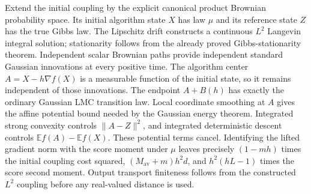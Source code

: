 \documentclass[11pt,a4paper]{report}
\begin{document}
Extend the initial coupling by the explicit canonical product Brownian probability space. Its initial algorithm state \(X\) has law \(\mu\) and its reference state \(Z\) has the true Gibbs law. The Lipschitz drift constructs a continuous \(L^{2}\) Langevin integral solution; stationarity follows from the already proved Gibbs-stationarity theorem. Independent scalar Brownian paths provide independent standard Gaussian innovations at every positive time. The algorithm center \(A=X-h\nabla f(X)\) is a measurable function of the initial state, so it remains independent of those innovations. The endpoint \(A+B(h)\) has exactly the ordinary Gaussian LMC transition law. Local coordinate smoothing at \(A\) gives the affine potential bound needed by the Gaussian energy theorem. Integrated strong convexity controls \(\|A-Z\|^{2}\), and integrated deterministic descent controls \(\mathbb E f(A)-\mathbb E f(X)\). These potential terms cancel. Identifying the lifted gradient norm with the score moment under \(\mu\) leaves precisely \((1-mh)\) times the initial coupling cost squared, \((M_{\mathrm{av}}+m)h^{2}d\), and \(h^2(hL-1)\) times the score second moment. Output transport finiteness follows from the constructed \(L^{2}\) coupling before any real-valued distance is used.
\end{document}
